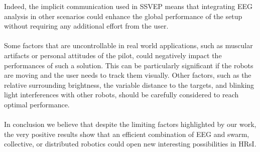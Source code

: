 \documentclass[smallextended]{svjour3}
\begin{document}
Indeed, the implicit communication used in SSVEP means that integrating EEG analysis in other scenarios could enhance the global performance of the setup without requiring any additional effort from the user.\\
\\
Some factors that are uncontrollable in real world applications, such as muscular artifacts or personal attitudes of the pilot, could negatively impact the performances of such a solution.
This can be particularly significant if the robots are moving and the user needs to track them visually. 
Other factors, such as the relative surrounding brightness, the variable distance to the targets, and blinking light interferences with other robots, should be carefully considered to reach optimal performance. \\
\\
In conclusion we believe that despite the limiting factors highlighted by our work, the very positive results show that an efficient combination of EEG and swarm, collective, or distributed robotics could open new interesting possibilities in HRsI.\\

\iffalse
\end{document}
